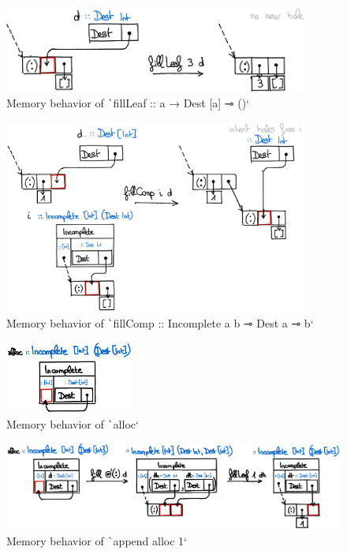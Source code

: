 \documentclass[english]{jflart}
\begin{document}
\begin{figure}[t]\centering
  \includegraphics[width=10cm]{fillLeaf.png}
  \caption{Memory behavior of \texttt`fillLeaf :: a → Dest [a] ⊸ ()`}
  \label{fig:schema-fillLeaf}
\end{figure}

\begin{figure}[t]\centering
  \includegraphics[width=10cm]{fillComp.png}
  \caption{Memory behavior of \texttt`fillComp :: Incomplete a b ⊸ Dest a ⊸ b`}
  \label{fig:schema-fillComp}
\end{figure}

\begin{figure}[t]\centering
  \includegraphics[width=4.2cm]{alloc.png}
  \caption{Memory behavior of \texttt`alloc`}
  \label{fig:schema-alloc}
\end{figure}

\begin{figure}[t]\centering
  \includegraphics[width=14cm]{dlist-append.png}
  \caption{Memory behavior of \texttt`append alloc 1`}
  \label{fig:schema-dlist-append}
\end{figure}
\end{document}
